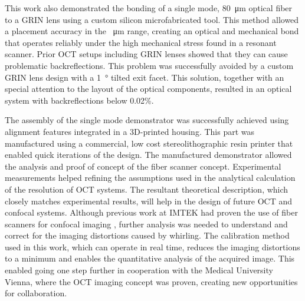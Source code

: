 \documentclass[10pt]{iopart}
\begin{document}
This work also demonstrated the bonding of a single mode, \SI{80}{\micro\meter} optical fiber to a GRIN lens using a custom silicon microfabricated tool. This method allowed a placement accuracy in the \SI{}{\micro\meter} range, creating an optical and mechanical bond that operates reliably under the high mechanical stress found in a resonant scanner. Prior OCT setups including GRIN lenses showed that they can cause problematic backreflections. This problem was successfully avoided by a custom GRIN lens design with a \SI{1}{\degree} tilted exit facet. This solution, together with an special attention to the layout of the optical components, resulted in an optical system with backreflections below 0.02\%.

The assembly of the single mode demonstrator was successfully achieved using alignment features integrated in a 3D-printed housing. This part was manufactured using a commercial, low cost stereolithographic resin printer that enabled quick iterations of the design. The manufactured demonstrator allowed the analysis and proof of concept of the fiber scanner concept. Experimental measurements helped refining the assumptions used in the analytical calculation of the resolution of OCT systems. The resultant theoretical description, which closely matches experimental results, will help in the design of future OCT and confocal systems. Although previous work at IMTEK had proven the use of fiber scanners for confocal imaging \cite{Meinert}, further analysis was needed to understand and correct for the imaging distortions caused by whirling. The calibration method used in this work, which can operate in real time, reduces the imaging distortions to a minimum and enables the quantitative analysis of the acquired image. This enabled going one step further in cooperation with the Medical University Vienna, where the OCT imaging concept was proven, creating new opportunities for collaboration. 
\end{document}

